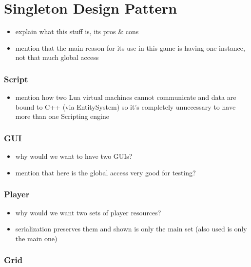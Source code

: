 \section{Singleton Design Pattern}

\begin{itemize}
    \item explain what this stuff is, its pros \& cons
    \item mention that the main reason for its use in this game
        is having one instance, not that much global access
\end{itemize}

\subsubsection{Script}

\begin{itemize}
    \item mention how two Lua virtual machines cannot communicate
        and data are bound to C++ (via EntitySystem) so it's completely
        unnecessary to have more than one Scripting engine
\end{itemize}

\subsubsection{GUI}

\begin{itemize}
    \item why would we want to have two GUIs?
    \item mention that here is the global access very good for testing?
\end{itemize}

\subsubsection{Player}

\begin{itemize}
    \item why would we want two sets of player resources?
    \item serialization preserves them and shown is only the main set
        (also used is only the main one)
\end{itemize}

\subsubsection{Grid}

